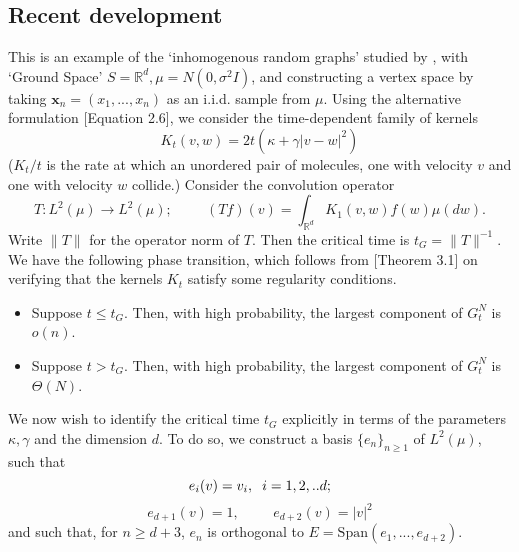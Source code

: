 \subsection{Recent development}
   This is an example of the `inhomogenous random graphs' studied by \cite{BJR07}, with `Ground Space' $S=\mathbb{R}^d, \mu=N(0,\sigma^2I)$, and constructing a vertex space by taking $\mathbf{x}_n=(x_1,...,x_n)$ as an i.i.d. sample from $\mu.$ Using the alternative formulation \cite{BJR07}[Equation 2.6], we consider the time-dependent family of kernels
   \begin{equation}
       K_t(v,w)=2t(\kappa+\gamma|v-w|^2)
   \end{equation}
   ($K_t/t$ is the rate at which an unordered pair of molecules, one with velocity $v$ and one with velocity $w$ collide.)
   Consider the convolution operator \begin{equation}\label{eq: T original}
       T: L^2(\mu)\rightarrow L^2(\mu); \hspace{1cm} (T f)(v)=\int_{\mathbb{R}^d} K_1(v,w)f(w)\mu(dw). 
   \end{equation} Write $\|T\|$ for the operator norm of $T$. Then the critical time is $t_G=\|T\|^{-1}.$ We have the following phase transition, which follows from \cite{BJR07}[Theorem 3.1] on verifying that the kernels $K_t$ satisfy some regularity conditions.  \begin{theorem} \begin{itemize}
       \item Suppose $t\leq t_G$. Then, with high probability, the largest component of $G^N_t$ is $o(n)$.
       \item Suppose $t>t_G.$ Then, with high probability, the largest component of $G^N_t$ is $\Theta(N)$.
   \end{itemize} \end{theorem} We now wish to identify the critical time $t_G$ explicitly in terms of the parameters $\kappa, \gamma$ and the dimension $d$. To do so, we construct a basis $\{e_n\}_{n\geq 1}$ of $L^2(\mu)$, such that \begin{equation*}
       e_i(v)=v_i, \hspace{0.2cm}i=1,2,..d;
   \end{equation*}
   \begin{equation*}
       e_{d+1}(v)=1, \hspace{1cm}e_{d+2}(v)=|v|^2
   \end{equation*} and such that, for $n\geq d+3$, $e_n$ is orthogonal to $E=\text{Span}(e_1,...,e_{d+2})$.
